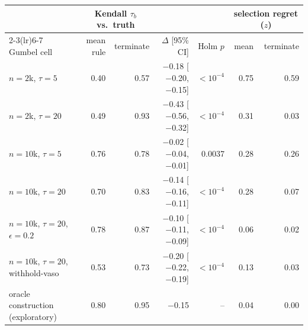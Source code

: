 \begin{tabular}{lrrrrrr}
\toprule
 & \multicolumn{2}{c}{Kendall $\tau_b$ vs.\ truth} & & & \multicolumn{2}{c}{selection regret ($z$)} \\
\cmidrule(lr){2-3}\cmidrule(lr){6-7}
Gumbel cell & mean rule & terminate & $\Delta$ [95\% CI] & Holm $p$ & mean & terminate \\
\midrule
$n{=}2$k, $\tau{=}5$ & 0.40 & 0.57 & $-$0.18 [$-$0.20, $-$0.15] & $<10^{-4}$ & 0.75 & 0.59 \\
$n{=}2$k, $\tau{=}20$ & 0.49 & 0.93 & $-$0.43 [$-$0.56, $-$0.32] & $<10^{-4}$ & 0.31 & 0.03 \\
$n{=}10$k, $\tau{=}5$ & 0.76 & 0.78 & $-$0.02 [$-$0.04, $-$0.01] & 0.0037 & 0.28 & 0.26 \\
$n{=}10$k, $\tau{=}20$ & 0.70 & 0.83 & $-$0.14 [$-$0.16, $-$0.11] & $<10^{-4}$ & 0.28 & 0.07 \\
$n{=}10$k, $\tau{=}20$, $\epsilon{=}0.2$ & 0.78 & 0.87 & $-$0.10 [$-$0.11, $-$0.09] & $<10^{-4}$ & 0.06 & 0.02 \\
$n{=}10$k, $\tau{=}20$, withhold-vaso & 0.53 & 0.73 & $-$0.20 [$-$0.22, $-$0.19] & $<10^{-4}$ & 0.13 & 0.03 \\
\midrule
oracle construction (exploratory) & 0.80 & 0.95 & $-$0.15 & -- & 0.04 & 0.00 \\
\bottomrule
\end{tabular}
